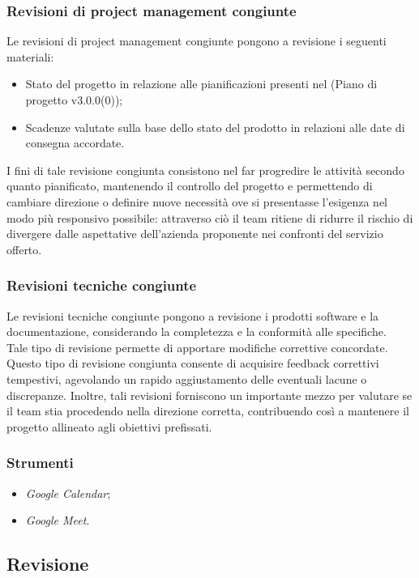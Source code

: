 \documentclass[10pt, a4paper]{article}
\begin{document}
\subsubsection{Revisioni di project management congiunte}
Le revisioni di project management congiunte pongono a revisione i seguenti materiali:
\begin{itemize}
    \item Stato del progetto in relazione alle pianificazioni presenti nel (Piano di progetto v3.0.0(0));
    \item Scadenze valutate sulla base dello stato del prodotto in relazioni alle date di consegna accordate.
\end{itemize}
I fini di tale revisione congiunta consistono nel far progredire le attività secondo quanto pianificato, mantenendo il controllo del progetto e 
permettendo di cambiare direzione o definire nuove necessità ove si presentasse l'esigenza nel modo più responsivo possibile: attraverso ciò il team
ritiene di ridurre il rischio di divergere dalle aspettative dell'azienda proponente nei confronti del servizio offerto.

\subsubsection{Revisioni tecniche congiunte}
Le revisioni tecniche congiunte pongono a revisione i prodotti software e la documentazione, considerando la completezza e la conformità alle specifiche.\\
Tale tipo di revisione permette di apportare modifiche correttive concordate. Questo tipo di revisione congiunta consente di acquisire feedback 
correttivi tempestivi, agevolando un rapido aggiustamento delle eventuali lacune o discrepanze. Inoltre, tali revisioni forniscono un importante 
mezzo per valutare se il team stia procedendo nella direzione corretta, contribuendo così a mantenere il progetto allineato agli obiettivi 
prefissati.

\subsubsection{Strumenti}
\begin{itemize}
    \item \textit{Google Calendar};
    \item \textit{Google Meet}.
\end{itemize}

\subsection{Revisione}
\end{document}
